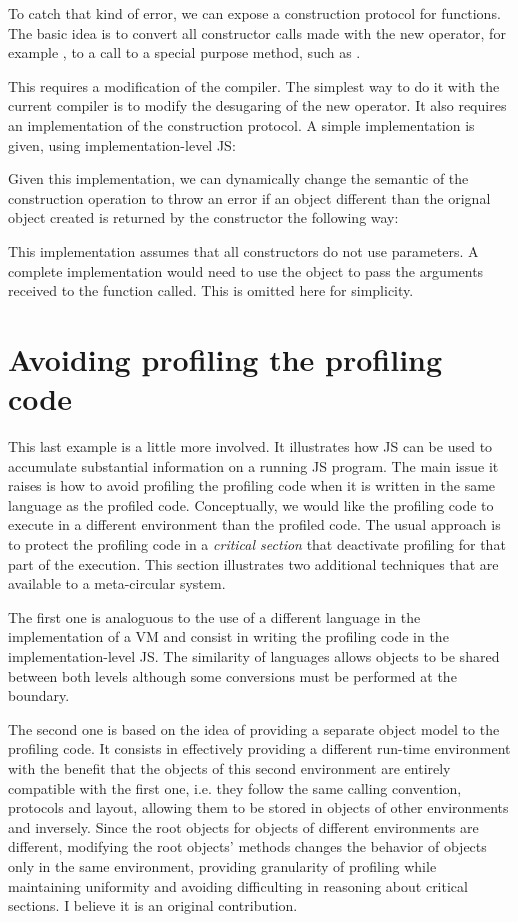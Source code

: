 To catch that kind of error, we can expose a construction protocol for
functions. The basic idea is to convert all constructor calls made with the new
operator, for example , to a call to a special purpose method,
such as .

This requires a modification of the compiler. The simplest way to do it with
the current compiler is to modify the desugaring of the new operator. It also
requires an implementation of the construction protocol. A simple
implementation is given, using implementation-level JS:


Given this implementation, we can dynamically change the semantic of the
construction operation to throw an error if an object different than the
orignal object created is returned by the constructor the following way:


This implementation assumes that all constructors do not use parameters. A
complete implementation would need to use the  object to pass the
arguments received to the function called. This is omitted here for simplicity.

\section{Avoiding profiling the profiling code}

This last example is a little more involved. It illustrates how JS can be used
to accumulate substantial information on a running JS program. The main issue
it raises is how to avoid profiling the profiling code when it is written in
the same language as the profiled code. Conceptually, we would like the
profiling code to execute in a different environment than the profiled code.
The usual approach is to protect the profiling code in a \textit{critical
section} that deactivate profiling for that part of the execution. This section
illustrates two additional techniques that are available to a meta-circular
system. 

The first one is analoguous to the use of a different language in the
implementation of a VM and consist in writing the profiling code in the
implementation-level JS. The similarity of languages allows objects to be
shared between both levels although some conversions must be performed at the
boundary. 

The second one is based on the idea of providing a separate object model to the
profiling code. It consists in effectively providing a different run-time
environment with the benefit that the objects of this second environment are
entirely compatible with the first one, i.e. they follow the same calling
convention, protocols and layout, allowing them to be stored in objects of
other environments and inversely. Since the root objects for objects of
different environments are different, modifying the root objects' methods
changes the behavior of objects only in the same environment, providing
granularity of profiling while maintaining uniformity and avoiding difficulting
in reasoning about critical sections. I believe it is an original contribution.

